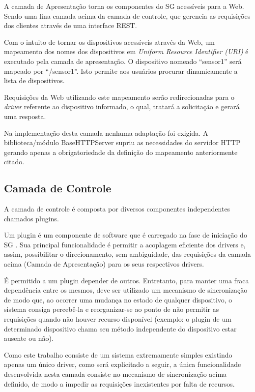 \documentclass[12pt,a4paper,oneside]{report}
\begin{document}
A camada de Apresentação torna os componentes do SG acessíveis para a Web. Sendo uma fina camada acima da camada de controle, que gerencia as requisições dos clientes através de uma interface REST.

Com o intuito de tornar os dispositivos acessíveis através da Web, um mapeamento dos nomes dos dispositivos em \emph{Uniform Resource Identifier (URI)} \cite{w3curi} é executado pela camada de apresentação. O dispositivo nomeado ``sensor1'' será mapeado por ``/sensor1''. Isto permite aos usuários procurar dinamicamente a lista de dispositivos.

Requisições da Web utilizando este mapeamento serão redirecionadas para o \emph{driver} referente ao dispositivo informado, o qual, tratará a solicitação e gerará uma resposta.

Na implementação desta camada nenhuma adaptação foi exigida. A biblioteca/módulo BaseHTTPServer supriu as necessidades do servidor HTTP gerando apenas a obrigatoriedade da definição do mapeamento anteriormente citado.

\subsection{Camada de Controle}

A camada de controle é composta por diversos componentes independentes chamados plugins.

Um plugin é um componente de software que é carregado na fase de iniciação do SG . Sua principal funcionalidade é permitir a acoplagem eficiente dos drivers e, assim, possibilitar o direcionamento, sem ambiguidade, das requisições da camada acima (Camada de Apresentação) para os seus respectivos drivers.

É permitido a um plugin depender de outros. Entretanto, para manter uma fraca dependência entre os mesmos, deve ser utilizado um mecanismo de sincronização de modo que, ao ocorrer uma mudança no estado de qualquer dispositivo, o sistema consiga percebê-la e reorganizar-se ao ponto de não permitir as requisições quando não houver recurso disponível (exemplo: o plugin de um determinado dispositivo chama seu método independente do dispositivo estar ausente ou não).

Como este trabalho consiste de um sistema extremamente simples existindo apenas um único driver, como será explicitado a seguir, a única funcionalidade desenvolvida nesta camada consiste no mecanismo de sincronização acima definido, de modo a impedir as requisições inexistentes por falta de recursos.
\end{document}
